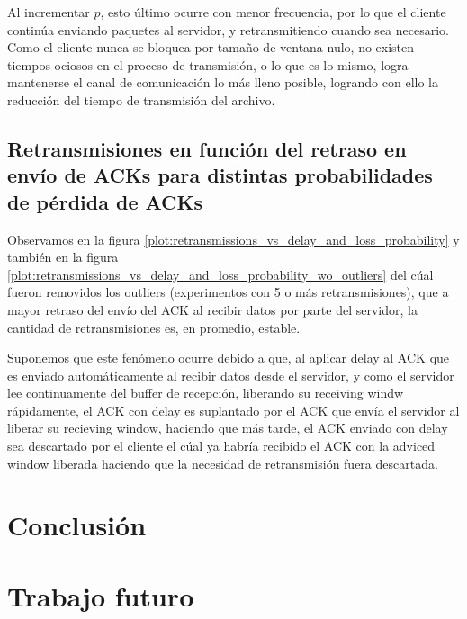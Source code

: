 \documentclass[a4paper, 10pt, twoside]{article}
\begin{document}
Al incrementar $p$, esto último ocurre con menor frecuencia, por lo que el cliente continúa enviando paquetes al servidor, y retransmitiendo cuando sea necesario. Como el cliente nunca se bloquea por tamaño de ventana nulo, no existen tiempos ociosos en el proceso de transmisión, o lo que es lo mismo, logra mantenerse el canal de comunicación lo más lleno posible, logrando con ello la reducción del tiempo de transmisión del archivo.


\subsection{Retransmisiones en función del retraso en envío de ACKs para distintas probabilidades de pérdida de ACKs} \label{sec:retr_vs_delay_and_loss}

Observamos en la figura \ref{plot:retransmissions_vs_delay_and_loss_probability} y también en la figura \ref{plot:retransmissions_vs_delay_and_loss_probability_wo_outliers} del cúal fueron removidos los outliers (experimentos con 5 o más retransmisiones), que a mayor retraso del envío del ACK al recibir datos por parte del servidor, la cantidad de retransmisiones es, en promedio, estable.

Suponemos que este fenómeno ocurre debido a que, al aplicar delay al ACK que es enviado automáticamente al recibir datos desde el servidor, y como el servidor lee continuamente del buffer de recepción, liberando su receiving windw rápidamente, el ACK con delay es suplantado por el ACK que envía el servidor al liberar su recieving window, haciendo que más tarde, el ACK enviado con delay sea descartado por el cliente el cúal ya habría recibido el ACK con la adviced window liberada haciendo que la necesidad de retransmisión fuera descartada.



\section{Conclusión}






\section{Trabajo futuro}




\begin{thebibliography}{9}


\end{thebibliography}
\end{document}
